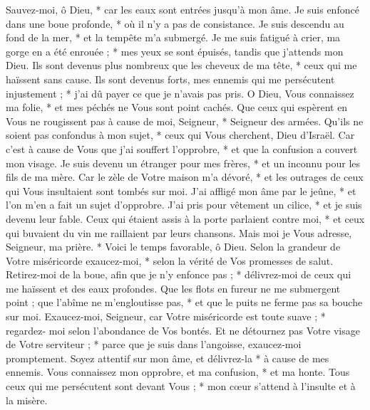  Sauvez-moi, ô Dieu, * car les eaux sont entrées jusqu'à mon âme.
\versseparator
 Je suis enfoncé dans une boue profonde, * où il n'y a pas de consistance.
\versseparator
 Je suis descendu au fond de la mer, * et la tempête m'a submergé.
\versseparator
 Je me suis fatigué à crier, ma gorge en a été enrouée ; * mes yeux se sont épuisés, tandis que j'attends mon Dieu.
\versseparator
 Ils sont devenus plus nombreux que les cheveux de ma tête, * ceux qui me haïssent sans cause.
\versseparator
 Ils sont devenus forts, mes ennemis qui me persécutent injustement ; * j'ai dû payer ce que je n'avais pas pris.
\versseparator
 O Dieu, Vous connaissez ma folie, * et mes péchés ne Vous sont point cachés.
\versseparator
 Que ceux qui espèrent en Vous ne rougissent pas à cause de moi, Seigneur, * Seigneur des armées.
\versseparator
 Qu'ils ne soient pas confondus à mon sujet, * ceux qui Vous cherchent, Dieu d'Israël.
\versseparator
 Car c'est à cause de Vous que j'ai souffert l'opprobre, * et que la confusion a couvert mon visage.
\versseparator
 Je suis devenu un étranger pour mes frères, * et un inconnu pour les fils de ma mère.
\versseparator
 Car le zèle de Votre maison m'a dévoré, * et les outrages de ceux qui Vous insultaient sont tombés sur moi.
\versseparator
 J'ai affligé mon âme par le jeûne, * et l'on m'en a fait un sujet d'opprobre.
\versseparator
 J'ai pris pour vêtement un cilice, * et je suis devenu leur fable.
\versseparator
 Ceux qui étaient assis à la porte parlaient contre moi, * et ceux qui buvaient du vin me raillaient par leurs chansons.
\versseparator
 Mais moi je Vous adresse, Seigneur, ma prière. * Voici le temps favorable, ô Dieu.
\versseparator
 Selon la grandeur de Votre miséricorde exaucez-moi, * selon la vérité de Vos promesses de salut.
\versseparator
 Retirez-moi de la boue, afin que je n'y enfonce pas ; * délivrez-moi de ceux qui me haïssent et des eaux profondes.
\versseparator
 Que les flots en fureur ne me submergent point ; que l'abîme ne m'engloutisse pas, * et que le puits ne ferme pas sa bouche sur moi.
\versseparator
 Exaucez-moi, Seigneur, car Votre miséricorde est toute suave ; * regardez- moi selon l'abondance de Vos bontés.
\versseparator
 Et ne détournez pas Votre visage de Votre serviteur ; * parce que je suis dans l'angoisse, exaucez-moi promptement.
\versseparator
 Soyez attentif sur mon âme, et délivrez-la * à cause de mes ennemis.
\versseparator
 Vous connaissez mon opprobre, et ma confusion, * et ma honte.
\versseparator
 Tous ceux qui me persécutent sont devant Vous ; * mon cœur s'attend à l'insulte et à la misère.
